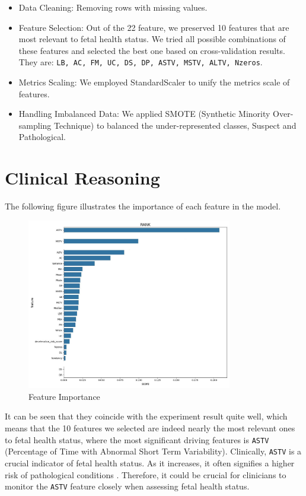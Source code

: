 \documentclass{article}
\begin{document}
\begin{itemize}
	\item Data Cleaning: Removing rows with missing values.
	\item Feature Selection: Out of the 22 feature, we preserved 10 features that are most relevant to fetal health status. We tried all possible combinations of these features and selected the best one based on cross-validation results. They are: \texttt{LB, AC, FM, UC, DS, DP, ASTV, MSTV, ALTV, Nzeros}.
	\item Metrics Scaling: We employed StandardScaler to unify the metrics scale of features.
	\item Handling Imbalanced Data: We applied SMOTE (Synthetic Minority Over-sampling Technique) to balanced the under-represented classes, Suspect and Pathological.
\end{itemize}

\section{Clinical Reasoning}

The following figure illustrates the importance of each feature in the model.

\begin{figure}[H]
	\centering
	\includegraphics[width=0.8\textwidth]{dis.jpeg}
	\caption{Feature Importance}
\end{figure}

It can be seen that they coincide with the experiment result quite well, which means that the 10 features we selected are indeed nearly the most relevant ones to fetal health status, where the most significant driving features is \texttt{ASTV} (Percentage of Time with Abnormal Short Term Variability). Clinically, \texttt{ASTV} is a crucial indicator of fetal health status. As it increases, it often signifies a higher risk of pathological conditions \cite{huang2021investigating}. Therefore, it could be crucial for clinicians to monitor the \texttt{ASTV} feature closely when assessing fetal health status.
\end{document}
